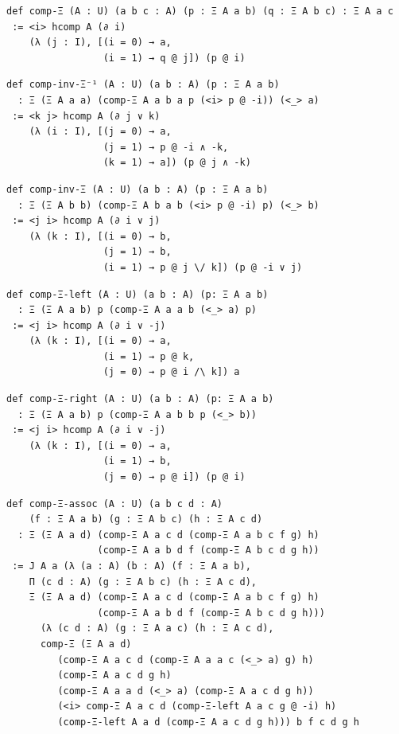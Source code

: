 \documentclass{article}
\theoremstyle{definition}
\begin{document}
\begin{lstlisting}
def comp-Ξ (A : U) (a b c : A) (p : Ξ A a b) (q : Ξ A b c) : Ξ A a c
 := <i> hcomp A (∂ i)
    (λ (j : I), [(i = 0) → a,
                 (i = 1) → q @ j]) (p @ i)
\end{lstlisting}

\begin{lstlisting}
def comp-inv-Ξ⁻¹ (A : U) (a b : A) (p : Ξ A a b)
  : Ξ (Ξ A a a) (comp-Ξ A a b a p (<i> p @ -i)) (<_> a)
 := <k j> hcomp A (∂ j ∨ k)
    (λ (i : I), [(j = 0) → a,
                 (j = 1) → p @ -i ∧ -k,
                 (k = 1) → a]) (p @ j ∧ -k)
\end{lstlisting}

\begin{lstlisting}
def comp-inv-Ξ (A : U) (a b : A) (p : Ξ A a b)
  : Ξ (Ξ A b b) (comp-Ξ A b a b (<i> p @ -i) p) (<_> b)
 := <j i> hcomp A (∂ i ∨ j)
    (λ (k : I), [(i = 0) → b,
                 (j = 1) → b,
                 (i = 1) → p @ j \/ k]) (p @ -i ∨ j)
\end{lstlisting}

\begin{lstlisting}
def comp-Ξ-left (A : U) (a b : A) (p: Ξ A a b)
  : Ξ (Ξ A a b) p (comp-Ξ A a a b (<_> a) p)
 := <j i> hcomp A (∂ i ∨ -j)
    (λ (k : I), [(i = 0) → a,
                 (i = 1) → p @ k,
                 (j = 0) → p @ i /\ k]) a
\end{lstlisting}

\begin{lstlisting}
def comp-Ξ-right (A : U) (a b : A) (p: Ξ A a b)
  : Ξ (Ξ A a b) p (comp-Ξ A a b b p (<_> b))
 := <j i> hcomp A (∂ i ∨ -j)
    (λ (k : I), [(i = 0) → a,
                 (i = 1) → b,
                 (j = 0) → p @ i]) (p @ i)
\end{lstlisting}

\begin{lstlisting}
def comp-Ξ-assoc (A : U) (a b c d : A)
    (f : Ξ A a b) (g : Ξ A b c) (h : Ξ A c d)
  : Ξ (Ξ A a d) (comp-Ξ A a c d (comp-Ξ A a b c f g) h)
                (comp-Ξ A a b d f (comp-Ξ A b c d g h))
 := J A a (λ (a : A) (b : A) (f : Ξ A a b),
    Π (c d : A) (g : Ξ A b c) (h : Ξ A c d),
    Ξ (Ξ A a d) (comp-Ξ A a c d (comp-Ξ A a b c f g) h)
                (comp-Ξ A a b d f (comp-Ξ A b c d g h)))
      (λ (c d : A) (g : Ξ A a c) (h : Ξ A c d),
      comp-Ξ (Ξ A a d)
         (comp-Ξ A a c d (comp-Ξ A a a c (<_> a) g) h)
         (comp-Ξ A a c d g h)
         (comp-Ξ A a a d (<_> a) (comp-Ξ A a c d g h))
         (<i> comp-Ξ A a c d (comp-Ξ-left A a c g @ -i) h)
         (comp-Ξ-left A a d (comp-Ξ A a c d g h))) b f c d g h
\end{lstlisting}
\end{document}
